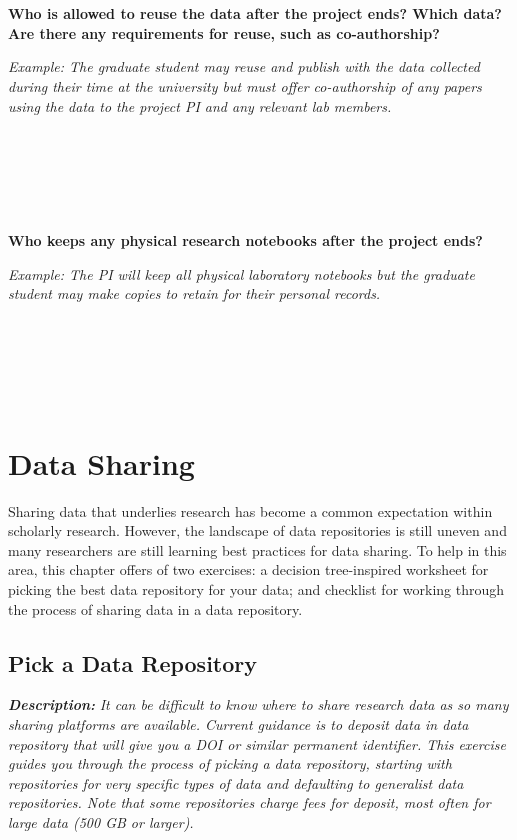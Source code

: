 \documentclass[
]{book}
\begin{document}
~

~

\textbf{Who is allowed to reuse the data after the project ends? Which data? Are there any requirements for reuse, such as co-authorship?}

\emph{Example: The graduate student may reuse and publish with the data collected during their time at the university but must offer co-authorship of any papers using the data to the project PI and any relevant lab members.}

~

~

~

\textbf{Who keeps any physical research notebooks after the project ends?}

\emph{Example: The PI will keep all physical laboratory notebooks but the graduate student may make copies to retain for their personal records.}

~

~

~

\hypertarget{data-sharing}{%
\chapter{Data Sharing}\label{data-sharing}}

Sharing data that underlies research has become a common expectation within scholarly research. However, the landscape of data repositories is still uneven and many researchers are still learning best practices for data sharing. To help in this area, this chapter offers of two exercises: a decision tree-inspired worksheet for picking the best data repository for your data; and checklist for working through the process of sharing data in a data repository.

\newpage

\hypertarget{data-repository}{%
\section{Pick a Data Repository}\label{data-repository}}

\textbf{\emph{Description:}} \emph{It can be difficult to know where to share research data as so many sharing platforms are available. Current guidance is to deposit data in data repository that will give you a DOI or similar permanent identifier. This exercise guides you through the process of picking a data repository, starting with repositories for very specific types of data and defaulting to generalist data repositories. Note that some repositories charge fees for deposit, most often for large data (500 GB or larger).}
\end{document}
